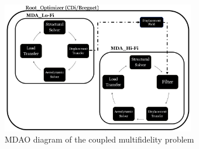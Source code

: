 \documentclass[conf]{new-aiaa}
\begin{document}
\begin{figure}[htpb]
    \centering
    \includegraphics[width=0.75\textwidth]{images/MDAOdiagram.png}
    \caption{MDAO diagram of the coupled multifidelity problem}
    \label{fig:MDAOdiagram}
\end{figure}
\end{document}
